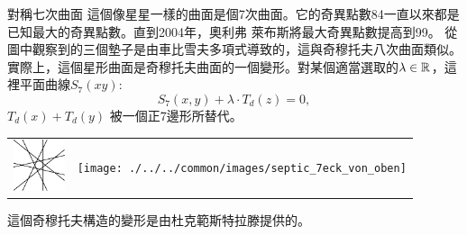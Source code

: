 \begin{surferPage}[七次曲面]{對稱七次曲面}
這個像星星一樣的曲面是個7次曲面。它的奇異點數84一直以來都是已知最大的奇異點數。直到2004年，奧利弗 萊布斯將最大奇異點數提高到99。
從圖中觀察到的三個墊子是由車比雪夫多項式導致的，這與奇穆托夫八次曲面類似。實際上，這個星形曲面是奇穆托夫曲面的一個變形。對某個適當選取的$\lambda\in{\mathbb R}$，這裡平面曲線$S_7(xy)$: \[S_7(x,y) + \lambda \cdot T_d(z) = 0,\] $T_d(x)+T_d(y)$ 被一個正7邊形所替代。
\vspace*{-0.3em}
    \begin{center}
      \begin{tabular}{c@{\qquad}c}
        \includegraphics[height=1.5cm]{./../../common/images/labsseptic1.pdf}
        &
        \texttt{[image: ./../../common/images/septic\_7eck\_von\_oben]}
      \end{tabular}
    \end{center}
    \vspace*{-0.3em}
這個奇穆托夫構造的變形是由杜克範斯特拉滕提供的。
\end{surferPage}
